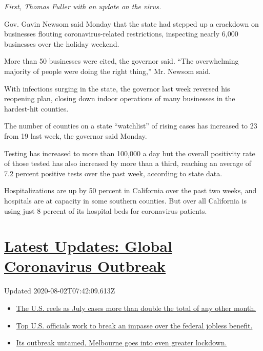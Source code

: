 \emph{First, Thomas Fuller with an update on the virus.}

Gov. Gavin Newsom said Monday that the state had stepped up a crackdown
on businesses flouting coronavirus-related restrictions, inspecting
nearly 6,000 businesses over the holiday weekend.

More than 50 businesses were cited, the governor said. ``The
overwhelming majority of people were doing the right thing,'' Mr. Newsom
said.

With infections surging in the state, the governor last week reversed
his reopening plan, closing down indoor operations of many businesses in
the hardest-hit counties.

The number of counties on a state ``watchlist'' of rising cases has
increased to 23 from 19 last week, the governor said Monday.

Testing has increased to more than 100,000 a day but the overall
positivity rate of those tested has also increased by more than a third,
reaching an average of 7.2 percent positive tests over the past week,
according to state data.

Hospitalizations are up by 50 percent in California over the past two
weeks, and hospitals are at capacity in some southern counties. But over
all California is using just 8 percent of its hospital beds for
coronavirus patients.

\hypertarget{latest-updates-global-coronavirus-outbreak}{%
\section{\texorpdfstring{\href{https://www.nytimes.com/2020/08/01/world/coronavirus-covid-19.html?action=click\&pgtype=Article\&state=default\&region=MAIN_CONTENT_1\&context=storylines_live_updates}{Latest
Updates: Global Coronavirus
Outbreak}}{Latest Updates: Global Coronavirus Outbreak}}\label{latest-updates-global-coronavirus-outbreak}}

Updated 2020-08-02T07:42:09.613Z

\begin{itemize}
\tightlist
\item
  \href{https://www.nytimes.com/2020/08/01/world/coronavirus-covid-19.html?action=click\&pgtype=Article\&state=default\&region=MAIN_CONTENT_1\&context=storylines_live_updates\#link-34047410}{The
  U.S. reels as July cases more than double the total of any other
  month.}
\item
  \href{https://www.nytimes.com/2020/08/01/world/coronavirus-covid-19.html?action=click\&pgtype=Article\&state=default\&region=MAIN_CONTENT_1\&context=storylines_live_updates\#link-780ec966}{Top
  U.S. officials work to break an impasse over the federal jobless
  benefit.}
\item
  \href{https://www.nytimes.com/2020/08/01/world/coronavirus-covid-19.html?action=click\&pgtype=Article\&state=default\&region=MAIN_CONTENT_1\&context=storylines_live_updates\#link-2bc8948}{Its
  outbreak untamed, Melbourne goes into even greater lockdown.}
\end{itemize}

